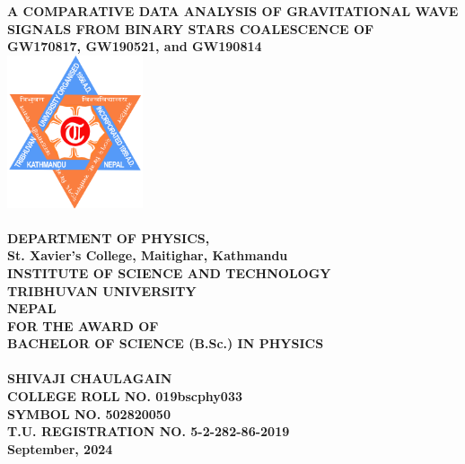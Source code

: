 \begin{titlepage}
	\thispagestyle{empty}
	\begin{center}
		\Large\textbf{ A COMPARATIVE DATA ANALYSIS OF GRAVITATIONAL WAVE SIGNALS FROM BINARY STARS COALESCENCE OF\\ GW170817, GW190521, and GW190814}\\
		\vspace{0.8cm}
		\includegraphics[width=0.3\textwidth]{images_/tulogo.png} \\
		\vspace{0.8cm}
		\large{} \\
		\large\textbf{DEPARTMENT OF PHYSICS,} \\
		\large\textbf{St. Xavier's College, Maitighar, Kathmandu} \\
		\large\textbf{INSTITUTE OF SCIENCE AND TECHNOLOGY } \\
		\large\textbf{TRIBHUVAN UNIVERSITY} \\
		\large\textbf{NEPAL} \\
		\vspace{0.8cm}
		\large\textbf{FOR THE AWARD OF} \\
		\large\textbf{BACHELOR OF SCIENCE (B.Sc.) IN PHYSICS} \\
		\vspace{0.8cm}
		\large {} \\
		\large\textbf{SHIVAJI CHAULAGAIN} \\
		\large\textbf{COLLEGE ROLL NO. 019bscphy033} \\
		\large\textbf{SYMBOL NO. 502820050}\\
		\large\textbf{T.U. REGISTRATION NO. 5-2-282-86-2019 }\\
		\vspace{1cm}
		\large\textbf{September, 2024}
	\end{center}
	\vspace{1.5cm}
\end{titlepage}